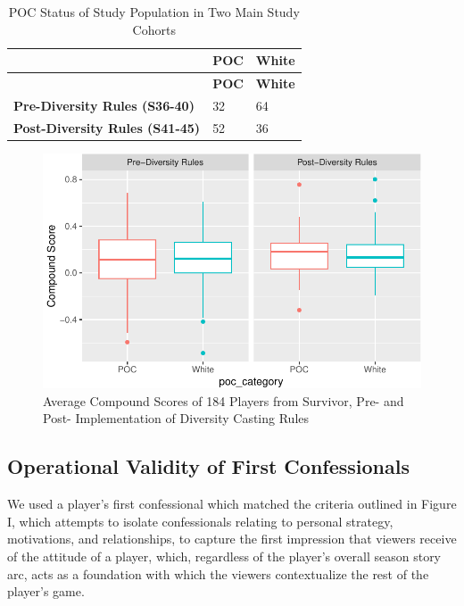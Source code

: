 \documentclass[
  letterpaper,
  DIV=11,
  numbers=noendperiod,
  oneside]{scrartcl}
\begin{document}
\begin{longtable}[]{@{}lll@{}}
\caption{POC Status of Study Population in Two Main Study
Cohorts}\tabularnewline
\toprule()
& \textbf{POC} & \textbf{White} \\
\midrule()
\endfirsthead
\toprule()
& \textbf{POC} & \textbf{White} \\
\midrule()
\endhead
\textbf{Pre-Diversity Rules (S36-40)} & 32 & 64 \\
\textbf{Post-Diversity Rules (S41-45)} & 52 & 36 \\
\bottomrule()
\end{longtable}

\begin{figure}

{\centering \includegraphics{Survivor_files/figure-pdf/Data-Cleaning-1.pdf}

}

\caption{Average Compound Scores of 184 Players from Survivor, Pre- and
Post- Implementation of Diversity Casting Rules}

\end{figure}

\hypertarget{operational-validity-of-first-confessionals}{%
\subsection{Operational Validity of First
Confessionals}\label{operational-validity-of-first-confessionals}}

We used a player's first confessional which matched the criteria
outlined in Figure I, which attempts to isolate confessionals relating
to personal strategy, motivations, and relationships, to capture the
first impression that viewers receive of the attitude of a player,
which, regardless of the player's overall season story arc, acts as a
foundation with which the viewers contextualize the rest of the player's
game.
\end{document}
